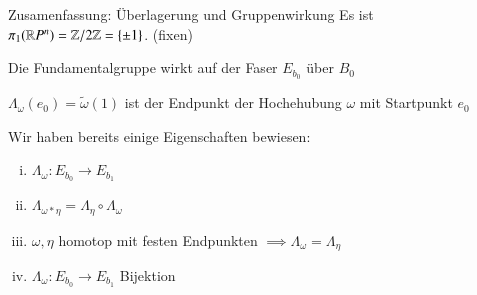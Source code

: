 \documentclass[a4paper,10pt]{scrartcl}
\begin{document}
\begin{seg}{Zusamenfassung: Überlagerung und Gruppenwirkung}
 \fixme[fig78]
Es ist $\pi_1(\mathbb{R} P^n)=\mathbb{Z}/2\mathbb{Z}=\{\pm 1\}$. (fixen)

Die Fundamentalgruppe wirkt auf der Faser $E_{b_0}$ über $B_0$\\
\fixme[fig79]


$\Lambda_\omega(e_0)=\tilde \omega(1)$ ist der Endpunkt der Hochehubung $\omega$ mit Startpunkt $e_0$

Wir haben bereits einige Eigenschaften bewiesen:
\begin{enumerate}[(i)]
 \item $\Lambda_\omega: E_{b_0} \to E_{b_1}$
 \item $\Lambda_{\omega*\eta}=\Lambda_{\eta} \circ \Lambda_{\omega}$
 \item $\omega, \eta$ homotop mit festen Endpunkten $\implies \Lambda_\omega=\Lambda_\eta$
 \item $\Lambda_\omega: E_{b_0} \to E_{b_1}$ Bijektion\\
\fixme[fig80]
\end{enumerate}
\end{seg}
\end{document}
